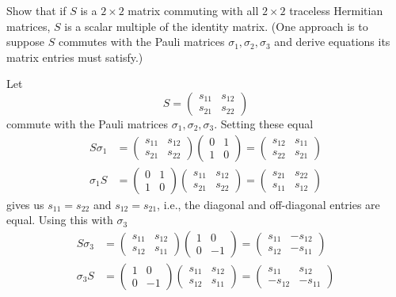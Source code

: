 \documentclass[10pt]{article}
\begin{document}
\begin{example}\label{b2e24}
	Show that if $S$ is a $2\times2$ matrix commuting with all $2\times2$ traceless Hermitian matrices, $S$ is a scalar multiple of the identity matrix. (One approach is to suppose $S$ commutes with the Pauli matrices $\sigma_1, \sigma_2, \sigma_3$ and derive equations its matrix entries must satisfy.)
\end{example}
\sol Let
$$
S = \begin{pmatrix}
	s_{11}&s_{12}\\s_{21}&s_{22}
\end{pmatrix}
$$
commute with the Pauli matrices $\sigma_1, \sigma_2, \sigma_3$. Setting these equal
$$
\begin{aligned}
	S\sigma_1 &= \begin{pmatrix}
		s_{11}&s_{12}\\s_{21}&s_{22}
	\end{pmatrix}\begin{pmatrix}
		0&1\\1&0
	\end{pmatrix} = \begin{pmatrix}
		s_{12}&s_{11}\\s_{22}&s_{21}
	\end{pmatrix}\\
	\sigma_1S &= \begin{pmatrix}
		0&1\\1&0
	\end{pmatrix}\begin{pmatrix}
		s_{11}&s_{12}\\s_{21}&s_{22}
	\end{pmatrix} = \begin{pmatrix}
		s_{21}&s_{22}\\s_{11}&s_{12}
	\end{pmatrix}
\end{aligned}
$$
gives us $s_{11} = s_{22}$ and  $s_{12} = s_{21}$, i.e., the diagonal and off-diagonal entries are equal. Using this with $\sigma_3$
$$
\begin{aligned}
	S\sigma_3 &= \begin{pmatrix}
		s_{11}&s_{12}\\s_{12}&s_{11}
	\end{pmatrix}\begin{pmatrix}
		1&0\\0&-1
	\end{pmatrix} = \begin{pmatrix}
		s_{11}&-s_{12}\\s_{12}&-s_{11}
	\end{pmatrix}\\
	\sigma_3S &= \begin{pmatrix}
		1&0\\0&-1
	\end{pmatrix}\begin{pmatrix}
		s_{11}&s_{12}\\s_{12}&s_{11}
	\end{pmatrix} = \begin{pmatrix}
		s_{11}&s_{12}\\-s_{12}&-s_{11}
	\end{pmatrix}
\end{aligned}
$$
\end{document}
